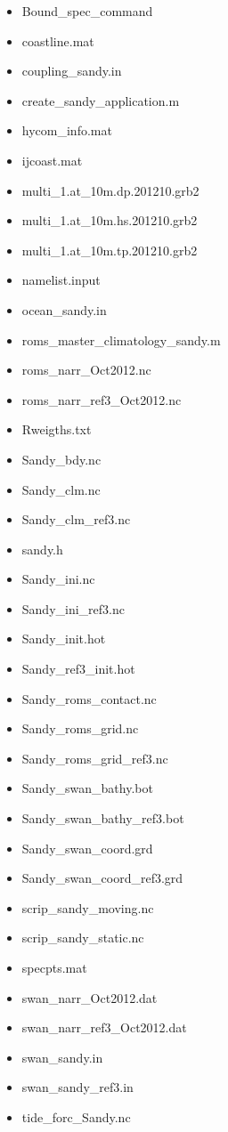 \begin{itemize}
\item Bound\_spec\_command
\item coastline.mat
\item coupling\_sandy.in
\item create\_sandy\_application.m
\item hycom\_info.mat
\item ijcoast.mat
\item multi\_1.at\_10m.dp.201210.grb2
\item multi\_1.at\_10m.hs.201210.grb2
\item multi\_1.at\_10m.tp.201210.grb2
\item namelist.input
\item ocean\_sandy.in
\item roms\_master\_climatology\_sandy.m
\item roms\_narr\_Oct2012.nc
\item roms\_narr\_ref3\_Oct2012.nc
\item Rweigths.txt
\item Sandy\_bdy.nc
\item Sandy\_clm.nc
\item Sandy\_clm\_ref3.nc
\item sandy.h
\item Sandy\_ini.nc
\item Sandy\_ini\_ref3.nc
\item Sandy\_init.hot
\item Sandy\_ref3\_init.hot
\item Sandy\_roms\_contact.nc
\item Sandy\_roms\_grid.nc
\item Sandy\_roms\_grid\_ref3.nc
\item Sandy\_swan\_bathy.bot
\item Sandy\_swan\_bathy\_ref3.bot
\item Sandy\_swan\_coord.grd
\item Sandy\_swan\_coord\_ref3.grd
\item scrip\_sandy\_moving.nc
\item scrip\_sandy\_static.nc
\item specpts.mat
\item swan\_narr\_Oct2012.dat
\item swan\_narr\_ref3\_Oct2012.dat
\item swan\_sandy.in
\item swan\_sandy\_ref3.in
\item tide\_forc\_Sandy.nc

\end{itemize}
